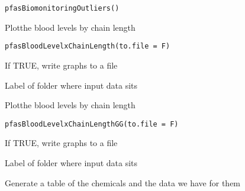 \documentclass[letterpaper]{book}
\begin{document}
%
\begin{Usage}
\begin{verbatim}
pfasBiomonitoringOutliers()
\end{verbatim}
\end{Usage}
%
\begin{Description}\relax
Plotthe blood levels by chain length
\end{Description}
%
\begin{Usage}
\begin{verbatim}
pfasBloodLevelxChainLength(to.file = F)
\end{verbatim}
\end{Usage}
%
\begin{Arguments}
\begin{ldescription}
\item[\code{to.file}] If TRUE, write graphs to a file

\item[\code{data.version}] Label of folder where input data sits
\end{ldescription}
\end{Arguments}
%
\begin{Description}\relax
Plotthe blood levels by chain length
\end{Description}
%
\begin{Usage}
\begin{verbatim}
pfasBloodLevelxChainLengthGG(to.file = F)
\end{verbatim}
\end{Usage}
%
\begin{Arguments}
\begin{ldescription}
\item[\code{to.file}] If TRUE, write graphs to a file

\item[\code{data.version}] Label of folder where input data sits
\end{ldescription}
\end{Arguments}
%
\begin{Description}\relax
Generate a table of the chemicals and the data we have for them
\end{Description}
\end{document}
